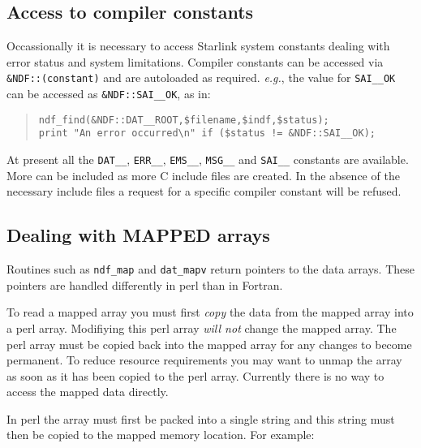 \documentclass[twoside,11pt]{article}
\newcommand{\xlabel}[1]{}
\newenvironment{myquote}{\begin{quote}\begin{small}}{\end{small}\end{quote}}
\begin{document}
\subsection{\xlabel{access_to_compiler_constants}Access to compiler constants}%
\label{access_to_compiler_constants}

Occassionally it is necessary to access Starlink system constants
dealing with error status and system limitations.  Compiler constants
can be accessed via \texttt{\&NDF::(constant)} and are autoloaded as
required.  \emph{e.g.}, the value for \texttt{SAI\_\_OK} can be
accessed as \texttt{\&NDF::SAI\_\_OK}, as in:

\begin{myquote}
\begin{verbatim}
ndf_find(&NDF::DAT__ROOT,$filename,$indf,$status);
print "An error occurred\n" if ($status != &NDF::SAI__OK);
\end{verbatim}
\end{myquote}

At present all the \texttt{DAT\_\_}, \texttt{ERR\_\_}, \texttt{EMS\_\_}, 
\texttt{MSG\_\_} and \texttt{SAI\_\_} constants are available.  More
can be included as more C include files are created.  In the absence of
the necessary include files a request for a specific compiler constant
will be refused.

\subsection{\xlabel{dealing_with_mapped_arrays}Dealing with MAPPED arrays}%
\label{dealing_with_mapped_arrays}

Routines such as \texttt{ndf\_map} and \texttt{dat\_mapv} return
pointers to the data arrays. These pointers are handled differently in
perl than in Fortran.

To read a mapped array you must first \emph{copy\/} the data from the mapped
array into a perl array. Modifiying this perl array \emph{will not\/} change
the mapped array. The perl array must be copied back into the mapped 
array for any changes to become permanent. To reduce resource requirements
you may want to unmap the array as soon as it has been copied to the 
perl array. Currently there is no way to access the mapped data directly.

In perl the array must first be packed into a single string and this
string must then be copied to the mapped memory location.
For example:
\end{document}
